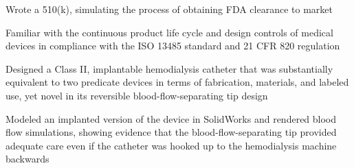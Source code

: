 \documentclass[letterpaper]{deedy-resume} %
\begin{document}
\begin{minipage}[t]{0.66\textwidth}
\begin{tightitemize}
\item Wrote a 510(k), simulating the process of obtaining FDA clearance to market
\item Familiar with the continuous product life cycle and design controls of medical devices in compliance with the ISO 13485 standard and 21 CFR 820 regulation  
\item Designed a Class II, implantable hemodialysis catheter that was substantially equivalent to two predicate devices in terms of fabrication, materials, and labeled use, yet novel in its reversible blood-flow-separating tip design 
\item Modeled an implanted version of the device in SolidWorks and rendered blood flow simulations, showing evidence that the blood-flow-separating tip provided adequate care even if the catheter was hooked up to the hemodialysis machine backwards 
\end{tightitemize}

\sectionspace 






\end{minipage} %

\end{document}
